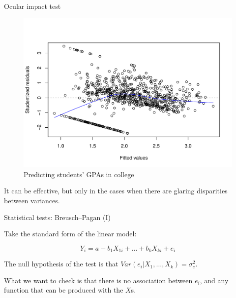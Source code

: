 \documentclass[12pt,english,pdf,xcolor=dvipsnames,aspectratio=169,handout]{beamer}\usepackage[]{graphicx}\usepackage[]{xcolor}
\begin{document}
\begin{frame}{Ocular impact test}




\begin{figure}
\centering
\includegraphics[scale=0.4]{../04-graphs/02-03}
\caption{Predicting students' GPAs in college}
\end{figure}

It can be effective, but only in the cases when there are glaring disparities between variances.
\end{frame}



\begin{frame}{Statistical tests: Breusch--Pagan (I)}

Take the standard form of the linear model:

\begin{equation}
Y_i = a + b_1X_{1i} + \dots + b_kX_{ki} + e_i
\end{equation}

The null hypothesis of the test is that $Var(e_i | X_1, \dots, X_k) = \sigma_e^2$.\bigskip

What we want to check is that there is no association between $e_i$, and any function that can be produced with the $X$s.

\end{frame}
\end{document}
